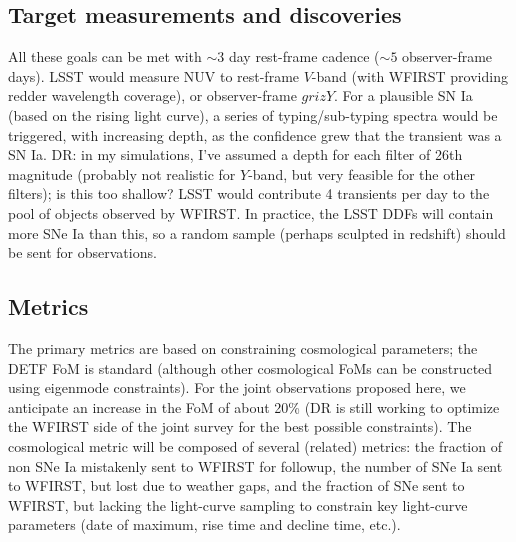 
\subsection{Target measurements and discoveries}
\label{sec:\secname:targets}

%



All these goals can be met with $\sim 3$ day rest-frame cadence ($\sim 5$ observer-frame days). LSST would measure NUV to rest-frame $V$-band (with WFIRST providing redder wavelength coverage), or observer-frame $grizY$. For a plausible SN Ia (based on the rising light curve), a series of typing/sub-typing spectra would be triggered, with increasing depth, as the confidence grew that the transient was a SN Ia. DR: in my simulations, I've assumed a depth for each filter of 26th magnitude (probably not realistic for $Y$-band, but very feasible for the other filters); is this too shallow? LSST would contribute 4 transients per day to the pool of objects observed by WFIRST. In practice, the LSST DDFs will contain more SNe Ia than this, so a random sample (perhaps sculpted in redshift) should be sent for observations.


\subsection{Metrics}
\label{sec:\secname:metrics}


The primary metrics are based on constraining cosmological parameters; the DETF FoM is standard (although other cosmological FoMs can be constructed using eigenmode constraints). For the joint observations proposed here, we anticipate an increase in the FoM of about 20\% (DR is still working to optimize the WFIRST side of the joint survey for the best possible constraints). The cosmological metric will be composed of several (related) metrics: the fraction of non SNe Ia mistakenly sent to WFIRST for followup, the number of SNe Ia sent to WFIRST, but lost due to weather gaps, and the fraction of SNe sent to WFIRST, but lacking the light-curve sampling to constrain key light-curve parameters (date of maximum, rise time and decline time, etc.).

